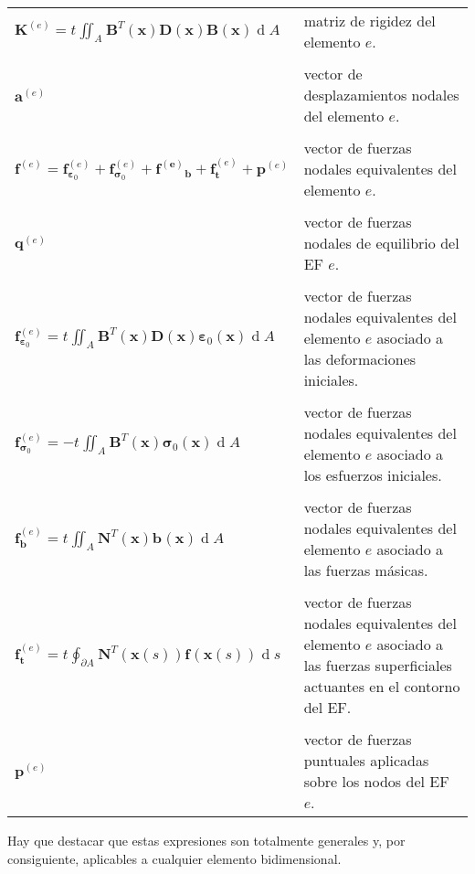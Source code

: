 \documentclass[12pt,letterpaper, landscape]{article}
\newcommand{\e}{{}}
\newcommand{\ve}[1]{{\boldsymbol{#1}}}
\newcommand{\ma}[1]{{\boldsymbol{#1}}}
\newcommand{\dd}{\operatorname{d} \!}
\begin{document}
\begin{tabular}{lp{14.2cm}}
   $\displaystyle \ma{K}^{(e)} = t^\e \iint_{A^\e}  \ma{B}^T(\ve{x})\ma{D}(\ve{x})\ma{B}(\ve{x}) \dd A$ & matriz de rigidez del elemento $e$.\\
   \\[-1ex]
   $\ve{a}^{(e)}$ & vector de desplazamientos nodales del elemento $e$.\\
   \\[-1ex]
   $\ma{f}^{(e)} = \ve{f}_{\ve{\varepsilon}_0}^{(e)} + \ve{f}_{\ve{\sigma}_0}^{(e)} + \ve{f^{(e)}}_\ve{b} + \ve{f}^{(e)}_\ve{t} + \ve{p}^{(e)}$     &  vector de fuerzas nodales equivalentes del elemento $e$.\\
   \\[-1ex]
   $\ve{q}^{(e)}$ & vector de fuerzas nodales de equilibrio del EF $e$.\\   
   \\[-1ex]
   $\displaystyle\ve{f}^{(e)}_{\ve{\varepsilon}_0} = t^\e \iint_{A^\e}  \ma{B}^T(\ve{x})\ma{D}(\ve{x})\ve{\varepsilon}_0(\ve{x}) \dd A$      & vector de fuerzas nodales equivalentes del elemento $e$ asociado a las deformaciones iniciales.\\
   \\[-1ex]   
   $\displaystyle \ve{f}^{(e)}_{\ve{\sigma}_0} = -t^\e \iint_{A^\e}  \ma{B}^T(\ve{x})\ve{\sigma}_0(\ve{x}) \dd A$ &vector de fuerzas nodales equivalentes del elemento $e$ asociado a los esfuerzos iniciales.\\
   \\[-1ex]
   $\displaystyle \ve{f}^{(e)}_\ve{b} = t^\e \iint_{A^\e}  \ma{N}^T(\ve{x}) \ve{b}^\e(\ve{x}) \dd A$ &vector de fuerzas nodales equivalentes del elemento $e$ asociado a las fuerzas másicas.\\
   \\[-1ex]
   $\displaystyle \ve{f}^{(e)}_\ve{t} = t^\e \oint_{\partial A^\e} \ma{N}^T(\ve{x}(s)) \ve{f}^\e(\ve{x}(s)) \dd s$ &vector de fuerzas nodales equivalentes del elemento $e$ asociado a las fuerzas superficiales actuantes en el contorno del EF.\\
\\[-1ex]   
   $\ve{p}^{(e)}$       & vector de fuerzas puntuales aplicadas sobre los nodos del EF $e$.
\end{tabular} 

\vspace{\baselineskip}\vspace{\baselineskip}
Hay que destacar que estas expresiones son totalmente generales y, por consiguiente, aplicables a cualquier elemento bidimensional.
\end{document}
